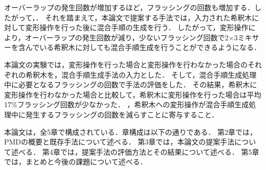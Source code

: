 オーバーラップの発生回数が増加するほど，フラッシングの回数も増加する．したがって，． それを踏まえて，本論文で提案する手法では，入力された希釈木に対して変形操作を行った後に混合手順の生成を行う．
したがって，変形操作により，オーバーラップの発生回数が減り，少ないフラッシング回数で2$\times$3ミキサーを含んでいる希釈木に対しても混合手順生成を行うことができるようになる．

本論文の実験では，変形操作を行った場合と変形操作を行わなかった場合のそれぞれの希釈木を，混合手順生成手法の入力とした．
そして，混合手順生成処理中に必要となるフラッシングの回数で手法の評価をした．
その結果，希釈木に変形操作を行わなかった場合と比較して，希釈木に変形操作を行った場合は平均17\%フラッシング回数が少なかった．
，希釈木への変形操作が混合手順生成処理中に発生するフラッシングの回数を減らすことに寄与すること．

本論文は，全5章で構成されている．章構成は以下の通りである．
第2章では，PMDの概要と既存手法について述べる．
第3章では，本論文の提案手法について述べる．
第4章では，提案手法の評価方法とその結果について述べる．
第5章では，まとめと今後の課題について述べる．

